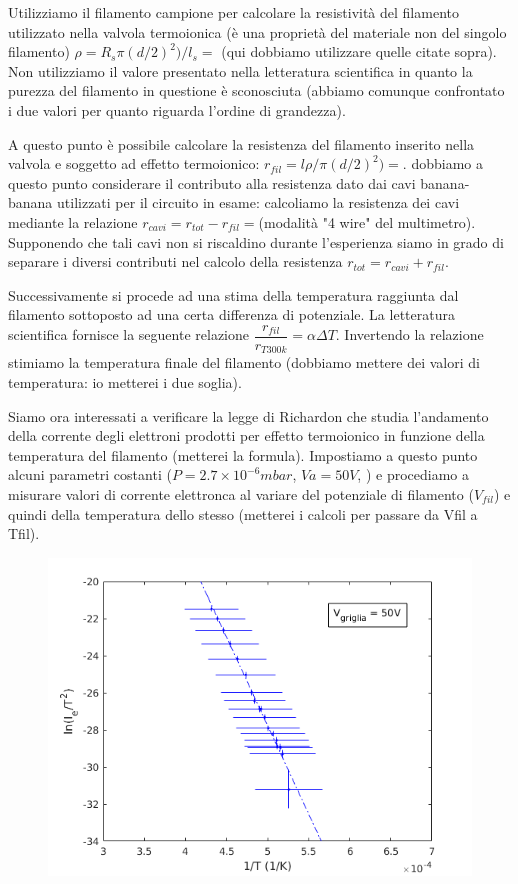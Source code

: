 \documentclass[11pt,a4paper]{article}
\begin{document}
Utilizziamo il filamento campione per calcolare la resistività del filamento utilizzato nella valvola termoionica (è una proprietà del materiale non del singolo filamento) $\rho=R_{s}\pi (d/2)^{2})/l_{s}=$ (qui dobbiamo utilizzare quelle citate sopra). Non utilizziamo il valore presentato nella letteratura scientifica in quanto la purezza del filamento in questione è sconosciuta (abbiamo comunque confrontato i due valori per quanto riguarda l'ordine di grandezza).

A questo punto è possibile calcolare la resistenza del filamento inserito nella valvola e soggetto ad effetto termoionico:
$ r_{fil}=l\rho/\pi (d/2)^{2})=$. 
dobbiamo a questo punto considerare il contributo alla resistenza dato dai cavi banana-banana utilizzati per il circuito in esame: calcoliamo la resistenza dei cavi mediante la relazione $r_{cavi}=r_{tot}-r_{fil}=$(modalità "4 wire" del multimetro). Supponendo che tali cavi non si riscaldino durante l'esperienza siamo in grado di separare i diversi contributi nel calcolo della resistenza $r_{tot}=r_{cavi}+r_{fil}$.

Successivamente si procede ad una stima della temperatura raggiunta dal filamento sottoposto ad una certa differenza di potenziale.
La letteratura scientifica fornisce la seguente relazione $\dfrac{r_{fil}}{r_{T300k}}=\alpha \Delta T $. Invertendo la relazione stimiamo la temperatura finale del filamento (dobbiamo mettere dei valori di temperatura: io metterei i due soglia).

Siamo ora interessati a verificare la legge di Richardon che studia l'andamento della corrente degli elettroni prodotti per effetto termoionico in funzione della temperatura del filamento (metterei la formula).
Impostiamo a questo punto alcuni parametri costanti (${P=2.7 \times 10^{-6} mbar}$, ${Va=50V}$, ) e procediamo a misurare valori di corrente elettronca al variare del potenziale di filamento ($V_{fil}$) e quindi della temperatura dello stesso (metterei i calcoli per passare da Vfil a Tfil).

\begin{figure}[h]
\includegraphics[width=\textwidth]{richardsonlin}
\end{figure}
\end{document}

